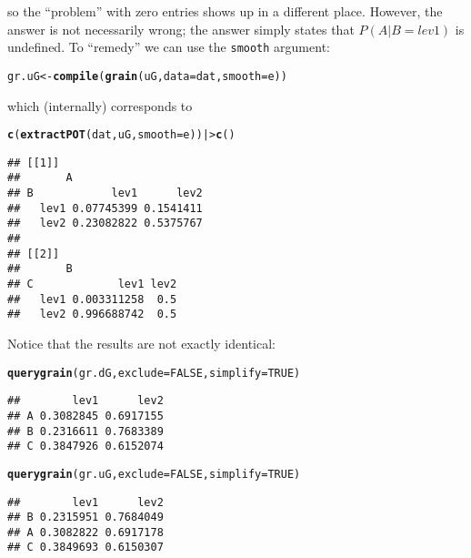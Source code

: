 \documentclass[10pt]{article}\usepackage[]{graphicx}\usepackage[]{xcolor}
\makeatletter
\newcommand{\hlnum}[1]{\textcolor[rgb]{0.686,0.059,0.569}{#1}}%
\newcommand{\hlstd}[1]{\textcolor[rgb]{0.345,0.345,0.345}{#1}}%
\newcommand{\hlkwb}[1]{\textcolor[rgb]{0.69,0.353,0.396}{#1}}%
\newcommand{\hlkwc}[1]{\textcolor[rgb]{0.333,0.667,0.333}{#1}}%
\newcommand{\hlkwd}[1]{\textcolor[rgb]{0.737,0.353,0.396}{\textbf{#1}}}%
\newenvironment{kframe}{%
 \def\at@end@of@kframe{}%
 \ifinner\ifhmode%
  \def\at@end@of@kframe{\end{minipage}}%
  \begin{minipage}{\columnwidth}%
 \fi\fi%
 \def\FrameCommand##1{\hskip\@totalleftmargin \hskip-\fboxsep
 \colorbox{shadecolor}{##1}\hskip-\fboxsep
     \hskip-\linewidth \hskip-\@totalleftmargin \hskip\columnwidth}%
 \MakeFramed {\advance\hsize-\width
   \@totalleftmargin\z@ \linewidth\hsize
   \@setminipage}}%
 {\par\unskip\endMakeFramed%
 \at@end@of@kframe}
\newenvironment{knitrout}{}{} %
\def\code#1{{\texttt{#1}}}
\makeatother
\begin{document}
so the ``problem'' with zero entries shows up in a different
place. However, the answer is not necessarily wrong; the answer simply
states that $P(A|B=lev1)$ is undefined.
To ``remedy'' we can use the \code{smooth} argument:
\begin{knitrout}
\color{fgcolor}\begin{kframe}
\begin{alltt}
\hlstd{gr.uG} \hlkwb{<-} \hlkwd{compile}\hlstd{(}\hlkwd{grain}\hlstd{(uG,} \hlkwc{data}\hlstd{=dat,} \hlkwc{smooth}\hlstd{=e))}
\end{alltt}
\end{kframe}
\end{knitrout}
which (internally) corresponds to
\begin{knitrout}
\color{fgcolor}\begin{kframe}
\begin{alltt}
\hlkwd{c}\hlstd{(}\hlkwd{extractPOT}\hlstd{(dat, uG,} \hlkwc{smooth}\hlstd{=e)) |>} \hlkwd{c}\hlstd{()}
\end{alltt}
\begin{verbatim}
## [[1]]
##       A
## B            lev1      lev2
##   lev1 0.07745399 0.1541411
##   lev2 0.23082822 0.5375767
## 
## [[2]]
##       B
## C             lev1 lev2
##   lev1 0.003311258  0.5
##   lev2 0.996688742  0.5
\end{verbatim}
\end{kframe}
\end{knitrout}

Notice that the results are not exactly identical:

\begin{knitrout}
\color{fgcolor}\begin{kframe}
\begin{alltt}
\hlkwd{querygrain}\hlstd{(gr.dG,} \hlkwc{exclude}\hlstd{=}\hlnum{FALSE}\hlstd{,} \hlkwc{simplify}\hlstd{=}\hlnum{TRUE}\hlstd{)}
\end{alltt}
\begin{verbatim}
##        lev1      lev2
## A 0.3082845 0.6917155
## B 0.2316611 0.7683389
## C 0.3847926 0.6152074
\end{verbatim}
\begin{alltt}
\hlkwd{querygrain}\hlstd{(gr.uG,} \hlkwc{exclude}\hlstd{=}\hlnum{FALSE}\hlstd{,} \hlkwc{simplify}\hlstd{=}\hlnum{TRUE}\hlstd{)}
\end{alltt}
\begin{verbatim}
##        lev1      lev2
## B 0.2315951 0.7684049
## A 0.3082822 0.6917178
## C 0.3849693 0.6150307
\end{verbatim}
\end{kframe}
\end{knitrout}
\end{document}
